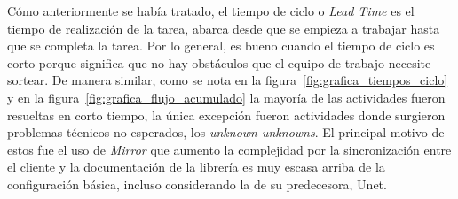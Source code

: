 Cómo anteriormente se había tratado, el tiempo de ciclo o \textit{Lead Time} es el tiempo de realización de la tarea, abarca desde que se empieza a trabajar hasta que se completa la tarea. Por lo general, es bueno cuando el tiempo de ciclo es corto porque significa que no hay obstáculos que el equipo de trabajo necesite sortear. De manera similar, como se nota en la figura~\ref{fig:grafica_tiempos_ciclo} y en la figura~\ref{fig:grafica_flujo_acumulado} la mayoría de las actividades fueron resueltas en corto tiempo, la única excepción fueron actividades donde surgieron problemas técnicos no esperados, los \textit{unknown unknowns}. El principal motivo de estos fue el uso de \textit{Mirror} que aumento la complejidad por la sincronización entre el cliente y la documentación de la librería es muy escasa arriba de la configuración básica, incluso considerando la de su predecesora, Unet.

